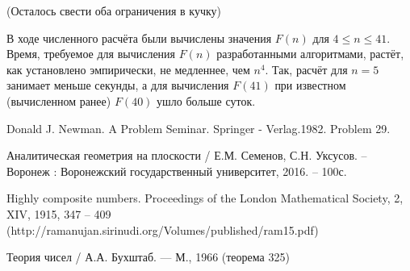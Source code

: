 \documentclass[a4paper,14pt]{article} %
\begin{document}
(Осталось свести оба ограничения в кучку)

В ходе численного расчёта были вычислены значения $F(n)$ для $4\leq n \leq 41$.
Время, требуемое для вычисления $F(n)$ разработанными алгоритмами, растёт, как установлено эмпирически, не медленнее, чем $n^4$.
Так, расчёт для $n=5$ занимает меньше секунды, а для вычисления $F(41)$ при известном (вычисленном ранее) $F(40)$ ушло больше суток.

\begin{thebibliography}{99}

 Donald J. Newman. A Problem Seminar. Springer - Verlag.1982. Problem 29.

 Аналитическая геометрия на плоскости / Е.М. Семенов, С.Н. Уксусов. – Воронеж : Воронежский государственный университет, 2016. – 100с.

 Highly composite numbers. Proceedings of the London Mathematical Society, 2, XIV, 1915, 347 – 409 (http://ramanujan.sirinudi.org/Volumes/published/ram15.pdf)

 Теория чисел / А.А. Бухштаб. --- М., 1966 (теорема 325)


\end{thebibliography}
\end{document}
